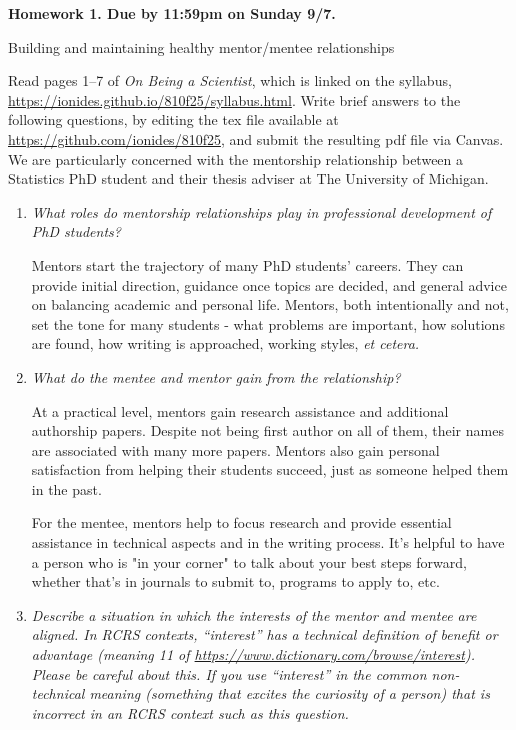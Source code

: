 \documentclass[12pt]{article}
\begin{document}
\begin{center}{\bf
Homework 1. Due by 11:59pm on Sunday 9/7.

Building and maintaining healthy mentor/mentee relationships
}\end{center}

Read pages 1--7 of {\em On Being a Scientist}, which is linked on the syllabus, \url{https://ionides.github.io/810f25/syllabus.html}. Write brief answers to the following questions, by editing the tex file available at \url{https://github.com/ionides/810f25}, and submit the resulting pdf file via Canvas. We are particularly concerned with the mentorship relationship between a Statistics PhD student and their thesis adviser at The University of Michigan.

\begin{enumerate}
\item \textit{What roles do mentorship relationships play in professional development of PhD students? }

Mentors start the trajectory of many PhD students' careers. They can provide initial direction, guidance
once topics are decided, and general advice on balancing academic and personal life. Mentors, both intentionally and
not, set the tone for many students - what problems are important, how solutions are found, how writing is 
approached, working styles, \textit{et cetera.}

\item \textit{What do the mentee and mentor gain from the relationship?}

At a practical level, mentors gain research assistance and additional authorship papers. Despite not being first author
on all of them, their names are associated with many more papers. Mentors also gain personal satisfaction
from helping their students succeed, just as someone helped them in the past.

For the mentee, mentors help to focus research and provide essential assistance in technical aspects and 
in the writing process. It's helpful to have a person who is "in your corner" to talk about your best steps
forward, whether that's in journals to submit to, programs to apply to, etc. 

\item \textit{Describe a situation in which the interests of the mentor and mentee are aligned. In RCRS contexts, ``interest'' has a technical definition of benefit or advantage (meaning 11 of \url{https://www.dictionary.com/browse/interest}). Please be careful about this. If you use ``interest'' in the common non-technical meaning (something that excites the curiosity of a person) that is incorrect in an RCRS context such as this question.}


\end{enumerate}
\end{document}
